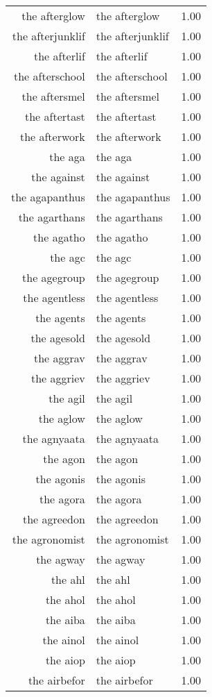 \begin{table}[ht]
\begin{tabular}{rlr}
  the afterglow & the afterglow & 1.00 \\ 
  the afterjunklif & the afterjunklif & 1.00 \\ 
  the afterlif & the afterlif & 1.00 \\ 
  the afterschool & the afterschool & 1.00 \\ 
  the aftersmel & the aftersmel & 1.00 \\ 
  the aftertast & the aftertast & 1.00 \\ 
  the afterwork & the afterwork & 1.00 \\ 
  the aga & the aga & 1.00 \\ 
  the against & the against & 1.00 \\ 
  the agapanthus & the agapanthus & 1.00 \\ 
  the agarthans & the agarthans & 1.00 \\ 
  the agatho & the agatho & 1.00 \\ 
  the agc & the agc & 1.00 \\ 
  the agegroup & the agegroup & 1.00 \\ 
  the agentless & the agentless & 1.00 \\ 
  the agents & the agents & 1.00 \\ 
  the agesold & the agesold & 1.00 \\ 
  the aggrav & the aggrav & 1.00 \\ 
  the aggriev & the aggriev & 1.00 \\ 
  the agil & the agil & 1.00 \\ 
  the aglow & the aglow & 1.00 \\ 
  the agnyaata & the agnyaata & 1.00 \\ 
  the agon & the agon & 1.00 \\ 
  the agonis & the agonis & 1.00 \\ 
  the agora & the agora & 1.00 \\ 
  the agreedon & the agreedon & 1.00 \\ 
  the agronomist & the agronomist & 1.00 \\ 
  the agway & the agway & 1.00 \\ 
  the ahl & the ahl & 1.00 \\ 
  the ahol & the ahol & 1.00 \\ 
  the aiba & the aiba & 1.00 \\ 
  the ainol & the ainol & 1.00 \\ 
  the aiop & the aiop & 1.00 \\ 
  the airbefor & the airbefor & 1.00 \\ 

\end{tabular}
\end{table}
